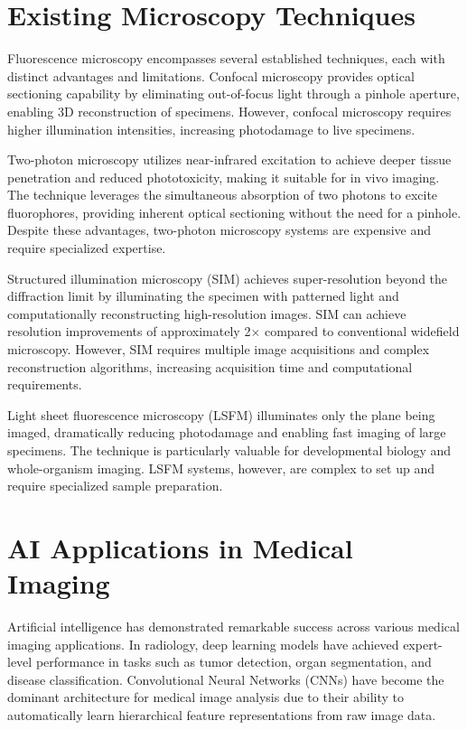 \documentclass[12pt,a4paper]{report}
\begin{document}
\section{Existing Microscopy Techniques}

Fluorescence microscopy encompasses several established techniques, each with distinct advantages and limitations. Confocal microscopy provides optical sectioning capability by eliminating out-of-focus light through a pinhole aperture, enabling 3D reconstruction of specimens. However, confocal microscopy requires higher illumination intensities, increasing photodamage to live specimens.

\vspace{0.5cm}

Two-photon microscopy utilizes near-infrared excitation to achieve deeper tissue penetration and reduced phototoxicity, making it suitable for in vivo imaging. The technique leverages the simultaneous absorption of two photons to excite fluorophores, providing inherent optical sectioning without the need for a pinhole. Despite these advantages, two-photon microscopy systems are expensive and require specialized expertise.

\vspace{0.5cm}

Structured illumination microscopy (SIM) achieves super-resolution beyond the diffraction limit by illuminating the specimen with patterned light and computationally reconstructing high-resolution images. SIM can achieve resolution improvements of approximately 2× compared to conventional widefield microscopy. However, SIM requires multiple image acquisitions and complex reconstruction algorithms, increasing acquisition time and computational requirements.

\vspace{0.5cm}

Light sheet fluorescence microscopy (LSFM) illuminates only the plane being imaged, dramatically reducing photodamage and enabling fast imaging of large specimens. The technique is particularly valuable for developmental biology and whole-organism imaging. LSFM systems, however, are complex to set up and require specialized sample preparation.

\section{AI Applications in Medical Imaging}

Artificial intelligence has demonstrated remarkable success across various medical imaging applications. In radiology, deep learning models have achieved expert-level performance in tasks such as tumor detection, organ segmentation, and disease classification. Convolutional Neural Networks (CNNs) have become the dominant architecture for medical image analysis due to their ability to automatically learn hierarchical feature representations from raw image data.
\end{document}
